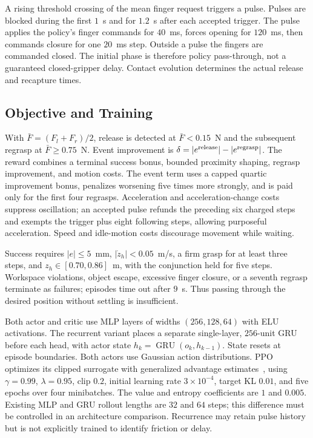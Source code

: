 \documentclass[letterpaper,10pt,conference]{ieeeconf}
\begin{document}
A rising threshold crossing of the mean finger request triggers a pulse. Pulses are blocked during the first $1$~s and for $1.2$~s after each accepted trigger. The pulse applies the policy's finger commands for $40$~ms, forces opening for $120$~ms, then commands closure for one $20$~ms step. Outside a pulse the fingers are commanded closed. The initial phase is therefore policy pass-through, not a guaranteed closed-gripper delay. Contact evolution determines the actual release and recapture times.

\subsection{Objective and Training}
With $\bar F=(F_l+F_r)/2$, release is detected at $\bar F<0.15$~N and the subsequent regrasp at $\bar F\geq0.75$~N. Event improvement is $\delta=|e^{\rm release}|-|e^{\rm regrasp}|$. The reward combines a terminal success bonus, bounded proximity shaping, regrasp improvement, and motion costs. The event term uses a capped quartic improvement bonus, penalizes worsening five times more strongly, and is paid only for the first four regrasps. Acceleration and acceleration-change costs suppress oscillation; an accepted pulse refunds the preceding six charged steps and exempts the trigger plus eight following steps, allowing purposeful acceleration. Speed and idle-motion costs discourage movement while waiting.

Success requires $|e|\leq5$~mm, $|\dot z_h|<0.05$~m/s, a firm grasp for at least three steps, and $z_h\in[0.70,0.86]$~m, with the conjunction held for five steps. Workspace violations, object escape, excessive finger closure, or a seventh regrasp terminate as failures; episodes time out after $9$~s. Thus passing through the desired position without settling is insufficient.

Both actor and critic use MLP layers of widths $(256,128,64)$ with ELU activations. The recurrent variant places a separate single-layer, $256$-unit GRU before each head, with actor state $h_k=\operatorname{GRU}(o_k,h_{k-1})$. State resets at episode boundaries. Both actors use Gaussian action distributions. PPO optimizes its clipped surrogate with generalized advantage estimates~\cite{schulman2016gae}, using $\gamma=0.99$, $\lambda=0.95$, clip $0.2$, initial learning rate $3\times10^{-4}$, target KL $0.01$, and five epochs over four minibatches. The value and entropy coefficients are $1$ and $0.005$. Existing MLP and GRU rollout lengths are $32$ and $64$ steps; this difference must be controlled in an architecture comparison. Recurrence may retain pulse history but is not explicitly trained to identify friction or delay.
\end{document}
